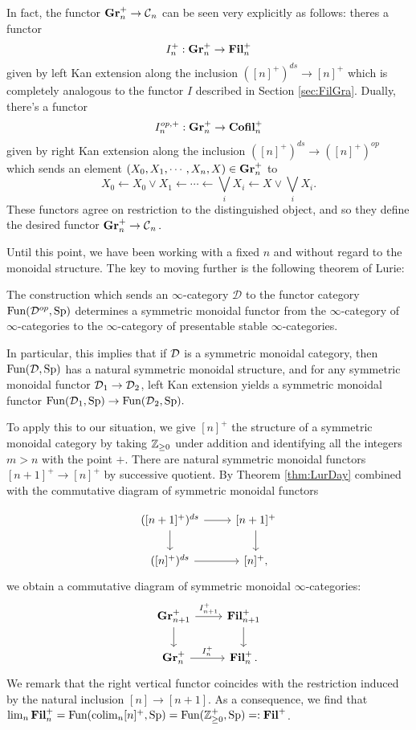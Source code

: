 In fact, the functor $\operatorname{\textbf{Gr}}_n^+ \to \operatorname{\mathcal{C}}_n$ can be seen very explicitly as follows: theres a functor $$I_n^+: \operatorname{\textbf{Gr}}_n^+ \to \operatorname{\textbf{Fil}}_n^+$$ given by left Kan extension along the inclusion $([n]^+)^{ds} \to [n]^+$ which is completely analogous to the functor $I$ described in Section \ref{sec:FilGra}.  Dually, there's a functor $$I_n^{op,+}:\operatorname{\textbf{Gr}}_n^+ \to \operatorname{\textbf{Cofil}}_n^+$$ given by right Kan extension along the inclusion $([n]^+)^{ds} \to ([n]^+)^{op}$ which sends an element $(X_0, X_1, \cdots, X_n, X)\in \operatorname{\textbf{Gr}}_n^+$ to $$X_0 \longleftarrow X_0\vee X_1 \longleftarrow \cdots \longleftarrow \bigvee_i X_i \longleftarrow X \vee \bigvee_i X_i.$$  These functors agree on restriction to the distinguished object, and so they define the desired functor $\operatorname{\textbf{Gr}}_n^+ \to \operatorname{\mathcal{C}}_n.$  





Until this point, we have been working with a fixed $n$ and without regard to the monoidal structure.  The key to moving further is the following theorem of Lurie:

\begin{thm}\label{thm:LurDay}%
The construction which sends an $\infty$-category $\mathcal{D}$ to the functor category $\operatorname{\text{Fun}}(\mathcal{D}^{op}, \operatorname{\text{Sp}})$ determines a symmetric monoidal functor from the $\infty$-category of $\infty$-categories to the $\infty$-category of presentable stable $\infty$-categories.  
\end{thm}

In particular, this implies that if $\operatorname{\mathcal{D}}$ is a symmetric monoidal category, then $\operatorname{\text{Fun}}(\operatorname{\mathcal{D}}, \operatorname{\text{Sp}})$ has a natural symmetric monoidal structure, and for any symmetric monoidal functor $\operatorname{\mathcal{D}}_1\to \operatorname{\mathcal{D}}_2$, left Kan extension yields a symmetric monoidal functor $\operatorname{\text{Fun}}(\operatorname{\mathcal{D}}_1,\operatorname{\text{Sp}}) \to \operatorname{\text{Fun}}(\operatorname{\mathcal{D}}_2,\operatorname{\text{Sp}}).$  

To apply this to our situation, we give $[n]^+$ the structure of a symmetric monoidal category by taking $\operatorname{\mathbb{Z}}_{\geq 0}$ under addition and identifying all the integers $m >n$ with the point $+$.  There are natural symmetric monoidal functors $[n+1]^+ \to [n]^+$ by successive quotient.  By Theorem \ref{thm:LurDay} combined with the commutative diagram of symmetric monoidal functors

$$
\begin{tikzcd}
(\lbrack n+1\rbrack^+)^{ds} \arrow[r] \arrow[d] & \lbrack n+1\rbrack^+ \arrow[d]\\
(\lbrack n\rbrack^+)^{ds} \arrow[r] & \lbrack n\rbrack^+ ,
\end{tikzcd}
$$
we obtain a commutative diagram of symmetric monoidal $\infty$-categories:
$$
\begin{tikzcd}
\Gr_{n+1}^+ \arrow[r,"I_{n+1}^+"] \arrow[d] & \Fil_{n+1}^+ \arrow[d]\\
\Gr_n^+  \arrow[r,"I_n^+"] & \Fil_n^+ .
\end{tikzcd}
$$
We remark that the right vertical functor coincides with the restriction induced by the natural inclusion $[n] \to [n+1]$.  As a consequence, we find that $\lim_n \operatorname{\textbf{Fil}}_n^+ = \operatorname{\text{Fun}}(\operatorname*{\text{colim}}_n [n]^+, \operatorname{\text{Sp}}) = \operatorname{\text{Fun}}(\operatorname{\mathbb{Z}}_{\geq 0}^+, \operatorname{\text{Sp}}) =: \operatorname{\textbf{Fil}}^+$.  

